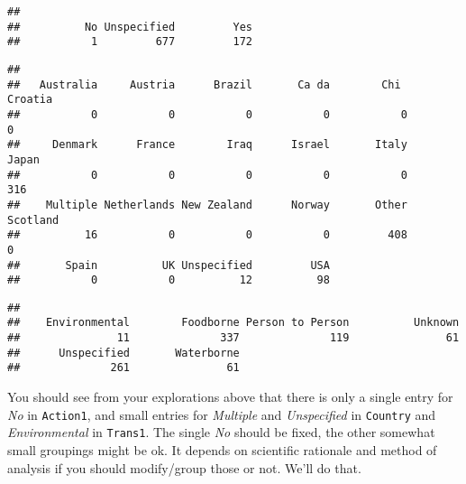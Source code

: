 \documentclass[]{article}
\newenvironment{Shaded}{\begin{snugshade}}{\end{snugshade}}
\newcommand{\KeywordTok}[1]{\textcolor[rgb]{0.13,0.29,0.53}{\textbf{#1}}}
\newcommand{\NormalTok}[1]{#1}
\newcommand{\OperatorTok}[1]{\textcolor[rgb]{0.81,0.36,0.00}{\textbf{#1}}}
\begin{document}
\begin{Shaded}
\end{Shaded}

\begin{verbatim}
## 
##          No Unspecified         Yes 
##           1         677         172
\end{verbatim}

\begin{Shaded}
\end{Shaded}

\begin{verbatim}
## 
##   Australia     Austria      Brazil       Ca da        Chi      Croatia 
##           0           0           0           0           0           0 
##     Denmark      France        Iraq      Israel       Italy       Japan 
##           0           0           0           0           0         316 
##    Multiple Netherlands New Zealand      Norway       Other    Scotland 
##          16           0           0           0         408           0 
##       Spain          UK Unspecified         USA 
##           0           0          12          98
\end{verbatim}

\begin{Shaded}
\end{Shaded}

\begin{verbatim}
## 
##    Environmental        Foodborne Person to Person          Unknown 
##               11              337              119               61 
##      Unspecified       Waterborne 
##              261               61
\end{verbatim}

You should see from your explorations above that there is only a single
entry for \emph{No} in \texttt{Action1}, and small entries for
\emph{Multiple} and \emph{Unspecified} in \texttt{Country} and
\emph{Environmental} in \texttt{Trans1}. The single \emph{No} should be
fixed, the other somewhat small groupings might be ok. It depends on
scientific rationale and method of analysis if you should modify/group
those or not. We'll do that.
\end{document}
